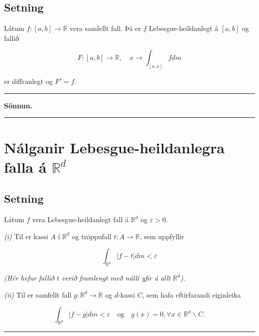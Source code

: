 \documentclass[]{book}
\begin{document}
\hypertarget{setning-56}{%
\section{Setning}\label{setning-56}}

Látum \(f:[a,b]\rightarrow\mathbb R\) vera samfellt fall. Þá er \(f\) Lebesgue-heildanlegt á \([a,b]\) og fallið

\[
F:[a,b]\rightarrow\mathbb R, \quad x\rightarrow\int_{[a,x]}fdm
\]

er diffranlegt og \(F' = f\).

\begin{center}\rule{0.5\linewidth}{\linethickness}\end{center}

\textbf{Sönnun.}

\begin{center}\rule{0.5\linewidth}{\linethickness}\end{center}

\hypertarget{nalganir-lebesgue-heildanlegra-falla-a-mathbb-rd}{%
\chapter{\texorpdfstring{Nálganir Lebesgue-heildanlegra falla á \(\mathbb R^d\)}{Nálganir Lebesgue-heildanlegra falla á \textbackslash{}mathbb R\^{}d}}\label{nalganir-lebesgue-heildanlegra-falla-a-mathbb-rd}}

\hypertarget{setning-57}{%
\section{Setning}\label{setning-57}}

Látum \(f\) vera Lebesgue-heildanlegt fall á \(\mathbb R^d\) og \(\varepsilon > 0\).

\emph{(i)} Til er kassi \(A\) í \(\mathbb R^d\) og tröppufall \(t:A\rightarrow\mathbb R\), sem uppfyllir

\[
\int_{\mathbb R^d}|f-t|dm < \varepsilon
\]

\emph{(Hér hefur fallið \(t\) verið framlengt með núlli yfir á allt \(\mathbb R^d\)).}

\emph{(ii)} Til er samfellt fall \(g:\mathbb R^d\rightarrow\mathbb R\) og \(d\)-kassi \(C\), sem hafa eftirfarandi eiginleika

\[
\int_{\mathbb R^d}|f-g|dm<\varepsilon \quad \text{og}\quad g(x) = 0, \forall x\in \mathbb R^d\backslash C.
\]

\begin{center}\rule{0.5\linewidth}{\linethickness}\end{center}
\end{document}
